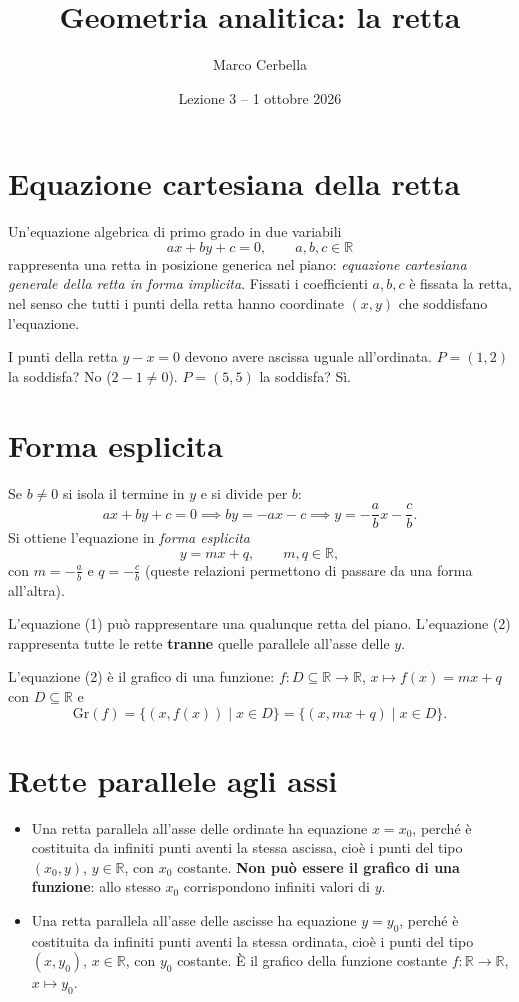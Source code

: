 \documentclass[11pt,a4paper]{article}
\title{Geometria analitica: la retta}
\author{Marco Cerbella}
\date{Lezione 3 -- 1 ottobre 2026}
\begin{document}
\maketitle

\section{Equazione cartesiana della retta}

Un'equazione algebrica di primo grado in due variabili
\[
ax + by + c = 0, \qquad a, b, c \in \mathbb{R} \tag{1}
\]
rappresenta una retta in posizione generica nel piano: \emph{equazione cartesiana generale della retta in forma implicita}. Fissati i coefficienti $a, b, c$ è fissata la retta, nel senso che tutti i punti della retta hanno coordinate $(x, y)$ che soddisfano l'equazione.

\begin{esempio}
I punti della retta $y - x = 0$ devono avere ascissa uguale all'ordinata. $P = (1, 2)$ la soddisfa? No ($2 - 1 \neq 0$). $P = (5, 5)$ la soddisfa? Sì.
\end{esempio}

\section{Forma esplicita}

Se $b \neq 0$ si isola il termine in $y$ e si divide per $b$:
\[
ax + by + c = 0 \implies by = -ax - c \implies y = -\frac{a}{b}x - \frac{c}{b}.
\]
Si ottiene l'equazione in \emph{forma esplicita}
\[
y = mx + q, \qquad m, q \in \mathbb{R}, \tag{2}
\]
con $m = -\frac{a}{b}$ e $q = -\frac{c}{b}$ (queste relazioni permettono di passare da una forma all'altra).

L'equazione (1) può rappresentare una qualunque retta del piano. L'equazione (2) rappresenta tutte le rette \textbf{tranne} quelle parallele all'asse delle $y$.

L'equazione (2) è il grafico di una funzione: $f : D \subseteq \mathbb{R} \to \mathbb{R}$, $x \mapsto f(x) = mx + q$ con $D \subseteq \mathbb{R}$ e
\[
\mathrm{Gr}(f) = \{(x, f(x)) \mid x \in D\} = \{(x, mx + q) \mid x \in D\}.
\]

\section{Rette parallele agli assi}

\begin{itemize}
    \item Una retta parallela all'asse delle ordinate ha equazione $x = x_0$, perché è costituita da infiniti punti aventi la stessa ascissa, cioè i punti del tipo $(x_0, y)$, $y \in \mathbb{R}$, con $x_0$ costante. \textbf{Non può essere il grafico di una funzione}: allo stesso $x_0$ corrispondono infiniti valori di $y$.
    \item Una retta parallela all'asse delle ascisse ha equazione $y = y_0$, perché è costituita da infiniti punti aventi la stessa ordinata, cioè i punti del tipo $(x, y_0)$, $x \in \mathbb{R}$, con $y_0$ costante. È il grafico della funzione costante $f : \mathbb{R} \to \mathbb{R}$, $x \mapsto y_0$.
\end{itemize}
\end{document}
